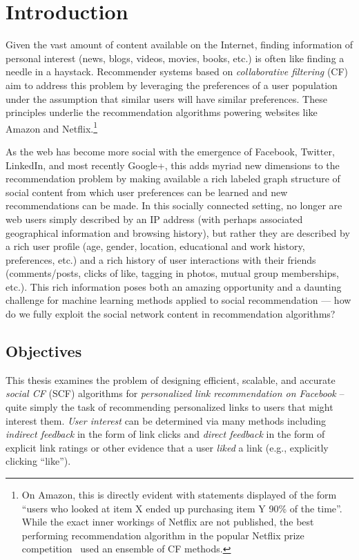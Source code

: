 
\chapter{Introduction}
\label{cha:intro}

Given the vast amount of content available on the Internet, finding
information of personal interest (news, blogs, videos, movies, books,
etc.) is often like finding a needle in a haystack.  Recommender
systems based on \emph{collaborative filtering} (CF) aim to address
this problem by leveraging the preferences of a user
population under the assumption that similar users
will have similar preferences.  These principles underlie the
recommendation algorithms powering websites like Amazon and
Netflix.\footnote{On Amazon, this is directly evident with statements
displayed of the form ``users who looked at item X ended up purchasing
item Y 90\% of the time''.  While the exact inner workings of Netflix
are not published, the best performing recommendation algorithm in
the popular Netflix prize competition~\cite{netflix} 
used an ensemble of CF methods.}

As the web has become more social with the emergence of Facebook,
Twitter, LinkedIn, and most recently Google+, this adds myriad new
dimensions to the recommendation problem by making available a rich
labeled graph structure of social content from which user preferences
can be learned and new recommendations can be made.  In this socially
connected setting, no longer are web users simply described by an IP
address (with perhaps associated geographical information and browsing
history), but rather they are described by a rich user profile (age,
gender, location, educational and work history, preferences, etc.)
and a rich history of user interactions with their friends (comments/posts, 
clicks of like, tagging in photos, mutual group
memberships, etc.).  This rich information poses both an amazing
opportunity and a daunting challenge for machine learning methods
applied to social recommendation --- how do we fully exploit the social
network content in recommendation algorithms?

\section{Objectives}

This thesis examines the problem of designing efficient, scalable, and
accurate \emph{social CF} (SCF) algorithms for \emph{personalized link
recommendation on Facebook} -- quite simply the task of recommending
personalized links to users that might interest them.  \emph{User
interest} can be determined via many methods including \emph{indirect
feedback} in the form of link clicks and \emph{direct feedback} in the form of
explicit link ratings or other evidence that a user \emph{liked}
a link (e.g., explicitly clicking ``like'').


